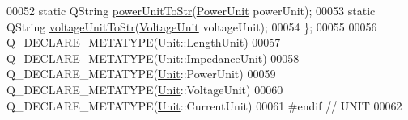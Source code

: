 \begin{DoxyCode}
00052   \textcolor{keyword}{static} QString \hyperlink{class_unit_ad1487441b5a7eb93a3eb0aeebe947725}{powerUnitToStr}(\hyperlink{class_unit_ace265ae255370ccacfd5370337572c3b}{PowerUnit} powerUnit);
00053   \textcolor{keyword}{static} QString \hyperlink{class_unit_a7fa103c31f9f069961b35b6371ff0c0a}{voltageUnitToStr}(\hyperlink{class_unit_a55b07dfa9457e1eca2c7194fe0cfc3c1}{VoltageUnit} voltageUnit);
00054 \};
00055 
00056 Q\_DECLARE\_METATYPE(\hyperlink{class_unit_a8c8921f7b225ad6063b1cb573425b9a0}{Unit::LengthUnit})
00057 Q\_DECLARE\_METATYPE(\hyperlink{class_unit}{Unit}::ImpedanceUnit)
00058 Q\_DECLARE\_METATYPE(\hyperlink{class_unit}{Unit}::PowerUnit)
00059 Q\_DECLARE\_METATYPE(\hyperlink{class_unit}{Unit}::VoltageUnit)
00060 Q\_DECLARE\_METATYPE(\hyperlink{class_unit}{Unit}::CurrentUnit)
00061 \textcolor{preprocessor}{#endif // UNIT}
00062 
\end{DoxyCode}
